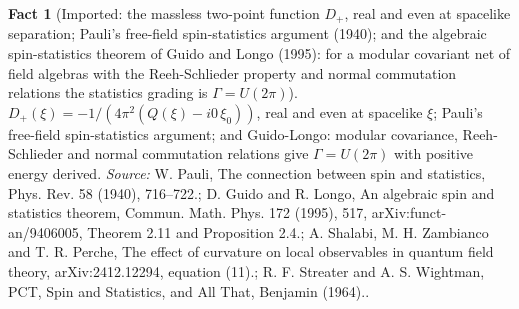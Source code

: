 \documentclass[11pt]{article}
\theoremstyle{definition}
\newtheorem{fact}[theorem]{Fact}
\theoremstyle{plain}
\begin{document}
\begin{fact}[Imported: the massless two-point function $D_{+}$, real and even at spacelike separation; Pauli's free-field spin-statistics argument (1940); and the algebraic spin-statistics theorem of Guido and Longo (1995): for a modular covariant net of field algebras with the Reeh-Schlieder property and normal commutation relations the statistics grading is $\Gamma = U(2\pi)$]\label{c:synthesis.imported-free-field-spin-statistics-and-guido-longo-theorem}
$D_{+}(\xi) = -1/(4\pi^{2}(Q(\xi) - i0\,\xi_{0}))$, real and even at spacelike $\xi$; Pauli's free-field spin-statistics argument; and Guido-Longo: modular covariance, Reeh-Schlieder and normal commutation relations give $\Gamma = U(2\pi)$ with positive energy derived.
\emph{Source:} W. Pauli, The connection between spin and statistics, Phys. Rev. 58 (1940), 716--722.; D. Guido and R. Longo, An algebraic spin and statistics theorem, Commun. Math. Phys. 172 (1995), 517, arXiv:funct-an/9406005, Theorem 2.11 and Proposition 2.4.; A. Shalabi, M. H. Zambianco and T. R. Perche, The effect of curvature on local observables in quantum field theory, arXiv:2412.12294, equation (11).; R. F. Streater and A. S. Wightman, PCT, Spin and Statistics, and All That, Benjamin (1964)..
\end{fact}
\end{document}
